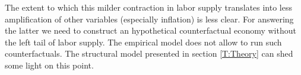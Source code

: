\documentclass[a4paper,12pt]{article}%
\begin{document}

The extent to which this milder contraction in labor supply translates into less amplification of other variables (especially inflation)  is less clear. For answering the latter we need to construct an hypothetical counterfactual economy without the left tail of labor supply.
The empirical model does not allow to run such counterfactuals. The structural model presented in section \ref{T:Theory} can shed some light on this point. %

\end{document}
